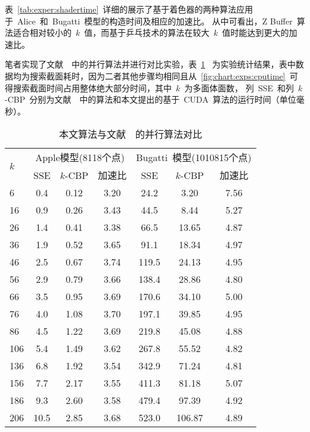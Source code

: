 表~\ref{tab:exper:shadertime}~详细的展示了基于着色器的两种算法应用于~Alice~和~Bugatti~模型的构造时间及相应的加速比。
从中可看出，Z Buffer~算法适合相对较小的~$k$~值，而基于乒乓技术的算法在较大~$k$~值时能达到更大的加速比。

笔者实现了文献~~中的并行算法并进行对比实验，表~\ref{tab:exp:sse-time}
~为实验统计结果，表中数据均为搜索截面耗时，因为二者其他步骤均相同且从~\ref{fig:chart:exps:cputime}~可得搜索截面时间占用整体绝大部分时间，其中~$k$~为多面体面数，
列~SSE~和列~$k$-CBP~分别为文献~~中的算法和本文提出的基于~CUDA~算法的运行时间（单位毫秒）。

\begin{table}[htbp] 
\centering
\caption{本文算法与文献~~的并行算法对比}
\begin{tabular}{p{1.5cm}<{\centering}ccc ccc} %
\toprule[1.5pt]
\multirow{2}{*}{$k$} & \multicolumn{3}{c}{Apple模型(8118个点)} &
\multicolumn{3}{c}{Bugatti~模型(1010815个点)}\\
\cmidrule(lr){2-4}\cmidrule(lr){5-7}
~&SSE\cite{karlsson2010parallel} & $k$-CBP &  加速比 & SSE & $k$-CBP &  加速比\\
\midrule[1pt]
6 & 0.4 & 0.12  & 3.20     & 24.2 & 3.20  & 7.56 \\
16 & 0.9 & 0.26  & 3.43    & 44.5 & 8.44  & 5.27 \\
26 & 1.4 & 0.41  & 3.38    & 66.5 & 13.65  & 4.87 \\
36 & 1.9 & 0.52  & 3.65    & 91.1 & 18.34  & 4.97 \\
46 & 2.5 & 0.67  & 3.74    & 119.5 & 24.13  & 4.95 \\
56 & 2.9 & 0.79  & 3.66    & 138.4 & 28.86  & 4.80 \\
66 & 3.5 & 0.95  & 3.69    & 170.6 & 34.10  & 5.00 \\
76 & 4.0 & 1.08  & 3.70    & 197.1 & 39.85  & 4.95 \\
86 & 4.5 & 1.22  & 3.69    & 219.8 & 45.08  & 4.88 \\
106 & 5.4 & 1.49  & 3.62   & 267.8 & 55.52  & 4.82 \\
136 &  6.8 & 1.92  & 3.54  & 342.9 & 71.24  & 4.81 \\
156 &  7.7 & 2.17  & 3.55  & 411.3 & 81.18  & 5.07 \\
186 &  9.3 & 2.60  & 3.58  & 479.4 & 97.39  & 4.92 \\
206 &  10.5 & 2.85  & 3.68 & 523.0 & 106.87  & 4.89  \\  
\bottomrule[1.5pt]
\end{tabular}
\label{tab:exp:sse-time}
\end{table}

